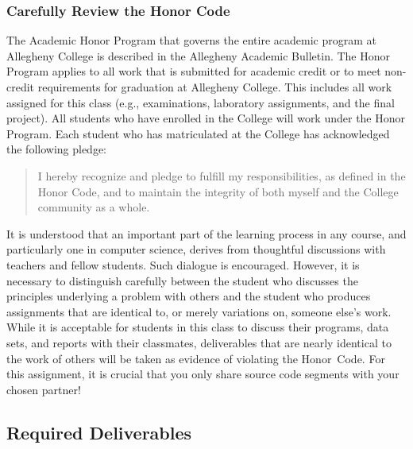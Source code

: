 \vspace*{-.15in}
\subsubsection*{Carefully Review the Honor Code}
\vspace*{-.05in}

The Academic Honor Program that governs the entire academic program at Allegheny College is described in the Allegheny
Academic Bulletin.  The Honor Program applies to all work that is submitted for academic credit or to meet non-credit
requirements for graduation at Allegheny College.  This includes all work assigned for this class (e.g., examinations,
  laboratory assignments, and the final project).  All students who have enrolled in the College will work under the Honor
Program.  Each student who has matriculated at the College has acknowledged the following pledge:

\vspace*{-.05in}
\begin{quote}
  I hereby recognize and pledge to fulfill my responsibilities, as defined in the Honor Code, and to maintain the
  integrity of both myself and the College community as a whole.
\end{quote}
\vspace*{-.05in}

\noindent It is understood that an important part of the learning process in any course, and particularly one in
computer science, derives from thoughtful discussions with teachers and fellow students.  Such dialogue is encouraged.
However, it is necessary to distinguish carefully between the student who discusses the principles underlying a problem
with others and the student who produces assignments that are identical to, or merely variations on, someone else's
work.  While it is acceptable for students in this class to discuss their programs, data sets, and reports with their
classmates, deliverables that are nearly identical to the work of others will be taken as evidence of violating the
\mbox{Honor Code}. For this assignment, it is crucial that you only share source code segments with your chosen partner!

\vspace*{-.1in}
\subsection*{Required Deliverables}

